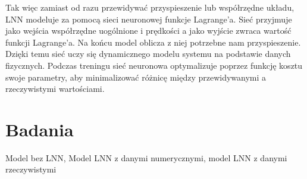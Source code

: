 \documentclass[]{article}
\begin{document}
	Tak więc zamiast od razu przewidywać przyspieszenie lub współrzędne układu,  LNN modeluje za pomocą sieci neuronowej funkcje Lagrange'a. Sieć przyjmuje jako wejścia współrzędne uogólnione i prędkości a jako wyjście zwraca wartość funkcji Lagrange'a. Na końcu model oblicza z niej potrzebne nam przyspieszenie. Dzięki temu sieć uczy się dynamicznego modelu systemu na podstawie danych fizycznych. Podczas treningu sieć neuronowa optymalizuje poprzez funkcję kosztu swoje parametry, aby minimalizować różnicę między przewidywanymi a rzeczywistymi wartościami.
	
	
	\section{Badania}
	Model bez LNN, Model LNN z danymi numerycznymi, model LNN z danymi rzeczywistymi
	
\end{document}
